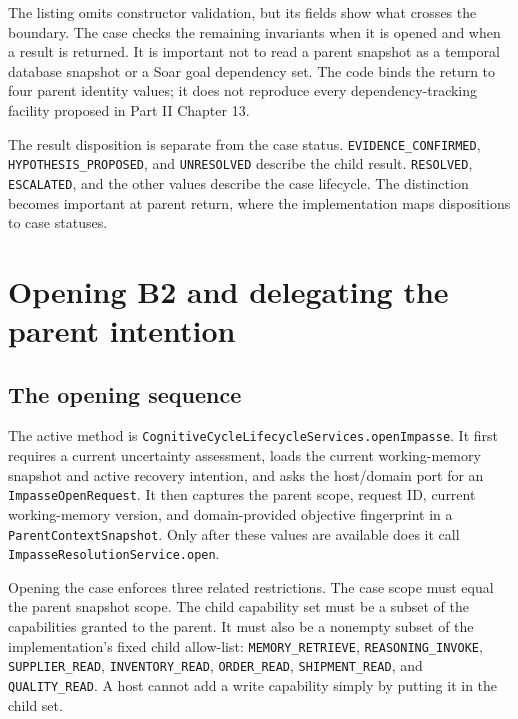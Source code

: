 The listing omits constructor validation, but its fields show what crosses the boundary. The case checks the remaining invariants when it is opened and when a result is returned. It is important not to read a parent snapshot as a temporal database snapshot or a Soar goal dependency set. The code binds the return to four parent identity values; it does not reproduce every dependency-tracking facility proposed in Part II Chapter 13.

The result disposition is separate from the case status. \texttt{EVIDENCE\_\allowbreak CONFIRMED}, \texttt{HYPOTHESIS\_\allowbreak PROPOSED}, and \texttt{UNRESOLVED} describe the child result. \texttt{RESOLVED}, \texttt{ESCALATED}, and the other values describe the case lifecycle. The distinction becomes important at parent return, where the implementation maps dispositions to case statuses.

\section{Opening B2 and delegating the parent intention}
\label{sec:ch22-open-delegate}

\subsection{The opening sequence}
\label{subsec:ch22-open-sequence}

The active method is \texttt{Cognitive\allowbreak Cycle\allowbreak Lifecycle\allowbreak Services.\allowbreak open\allowbreak Impasse}. It first requires a current uncertainty assessment, loads the current working-memory snapshot and active recovery intention, and asks the host/domain port for an \texttt{Impasse\allowbreak Open\allowbreak Request}. It then captures the parent scope, request ID, current working-memory version, and domain-provided objective fingerprint in a \texttt{Parent\allowbreak Context\allowbreak Snapshot}. Only after these values are available does it call \texttt{Impasse\allowbreak Resolution\allowbreak Service.\allowbreak open}.

Opening the case enforces three related restrictions. The case scope must equal the parent snapshot scope. The child capability set must be a subset of the capabilities granted to the parent. It must also be a nonempty subset of the implementation's fixed child allow-list: \texttt{MEMORY\_\allowbreak RETRIEVE}, \texttt{REASONING\_\allowbreak INVOKE}, \texttt{SUPPLIER\_READ}, \texttt{INVENTORY\_\allowbreak READ}, \texttt{ORDER\_READ}, \texttt{SHIPMENT\_READ}, and \texttt{QUALITY\_READ}. A host cannot add a write capability simply by putting it in the child set.

